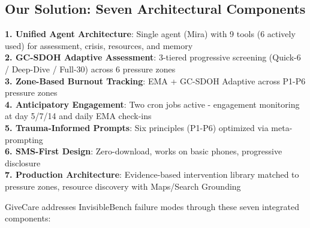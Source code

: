 \documentclass{article}
\begin{document}
\subsection{Our Solution: Seven Architectural Components}
\begin{tcolorbox}[colback=gcLightPeach!30!white,colframe=gcOrange!80!black,title=\textbf{Seven Integrated Components (see Figure~\ref{fig:system_architecture})},boxrule=1.5pt]
\textbf{1. Unified Agent Architecture}: Single agent (Mira) with 9 tools (6 actively used) for assessment, crisis, resources, and memory \\
\textbf{2. GC-SDOH Adaptive Assessment}: 3-tiered progressive screening (Quick-6 / Deep-Dive / Full-30) across 6 pressure zones\\
\textbf{3. Zone-Based Burnout Tracking}: EMA + GC-SDOH Adaptive across P1-P6 pressure zones\\
\textbf{4. Anticipatory Engagement}: Two cron jobs active - engagement monitoring at day 5/7/14 and daily EMA check-ins\\
\textbf{5. Trauma-Informed Prompts}: Six principles (P1-P6) optimized via meta-prompting\\
\textbf{6. SMS-First Design}: Zero-download, works on basic phones, progressive disclosure\\
\textbf{7. Production Architecture}: Evidence-based intervention library matched to pressure zones, resource discovery with Maps/Search Grounding
\end{tcolorbox}
GiveCare addresses InvisibleBench failure modes through these seven integrated components:
\end{document}
